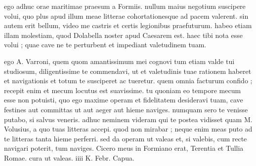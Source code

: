  ego adhuc orae maritimae praesum a Formiis. nullum maius negotium suscipere volui, quo plus apud illum meae litterae cohortationesque ad pacem valerent. sin autem erit bellum, video me castris et certis legionibus praefuturum. habeo etiam illam molestiam, quod Dolabella noster apud Caesarem est. haec tibi nota esse volui ; quae cave ne te perturbent et impediant valetudinem tuam.

 ego A. Varroni, quem quom amantissimum mei cognovi tum etiam valde tui studiosum, diligentissime te commendavi, ut et valetudinis tuae rationem haberet et navigationis et totum te susciperet ac tueretur. quem omnia facturum confido ; recepit enim et mecum locutus est suavissime. tu quoniam eo tempore mecum esse non potuisti, quo ego maxime operam et fidelitatem desideravi tuam, cave festines aut committas ut aut aeger aut hieme naviges. numquam sero te venisse putabo, si salvus veneris. adhuc neminem videram qui te postea vidisset quam M. Volusius, a quo tuas litteras accepi. quod non mirabar ; neque enim meas puto ad te litteras tanta hieme perferri. sed da operam ut valeas et, si valebis, cum recte navigari poterit, tum naviges. Cicero meus in Formiano erat, Terentia et Tullia Romae. cura ut valeas. iiii K. Febr. Capua.
